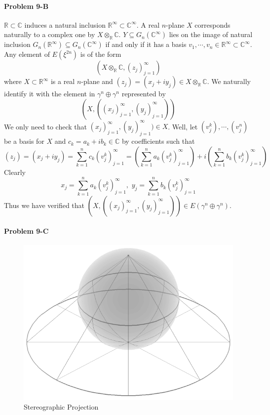 \documentclass[12pt]{article}
\theoremstyle{plain}
\theoremstyle{definition}
\newcommand{\IC}{\mathbb{C}}
\newcommand{\IR}{\mathbb{R}}
\newcommand\tensor{{\otimes}}
\newcommand{\<}{\langle}
\renewcommand{\>}{\rangle}
\begin{document}
\paragraph{Problem 9-B} $\IR \subset \IC$ induces a natural inclusion $\IR^\infty \subset \IC^\infty$. A real $n$-plane $X$ corresponds naturally to a complex one by $X \tensor_\IR \IC$. $Y \subseteq G_n(\IC^\infty)$ lies on the image of natural inclusion $G_n(\IR^\infty) \subseteq G_n(\IC^\infty)$ if and only if it has a basis $v_1, \cdots, v_n \in \IR^\infty \subset \IC^\infty$.  Any element of $E(\xi^{2n})$ is of the form 
$$ (X \tensor_\IR \IC, (z_j)_{j = 1}^\infty )$$
where $X \subset \IR^\infty$ is a real $n$-plane and $(z_j) = (x_j + iy_j) \in X \tensor_\IR \IC$. We naturally identify it with the element in $\gamma^n \oplus \gamma^n$ represented by 
$$ (X, ((x_j)_{j = 1}^\infty, (y_j)_{j = 1}^\infty)) $$
We only need to check that $(x_j)_{j = 1}^\infty, (y_j)_{j = 1}^\infty) \in X$. Well, let $(v^k_j), \cdots, (v^n_j)$ be a basis for $X$ and $c_k = a_k + i b_k \in \IC$ by coefficients such that $$(z_j) = (x_j + iy_j) = \sum_{k = 1}^n c_k (v_j^k)_{j = 1}^\infty = (\sum_{k = 1}^n a_k (v_j^k)_{j = 1}^\infty) + i(\sum_{k = 1}^n b_k (v_j^k)_{j = 1}^\infty)$$
Clearly 
$$ x_j = \sum_{k = 1}^n a_k (v_j^k)_{j = 1}^\infty, \, \, y_j = \sum_{k = 1}^n b_k (v_j^k)_{j = 1}^\infty$$
Thus we have verified that $(X, ((x_j)_{j = 1}^\infty, (y_j)_{j = 1}^\infty)) \in E(\gamma^n \oplus \gamma^n)$.

\paragraph{Problem 9-C} 

\begin{figure}[h!]
    \centering
    \includegraphics[scale=0.2]{Stereographic_projection.png}
    \caption{Stereographic Projection}
    \label{fig:awesome_image}
\end{figure}
\end{document}
